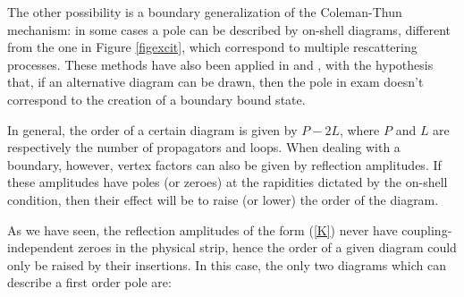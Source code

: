 \documentclass[a4paper,12pt]{report}
\begin{document}
The other possibility is a boundary generalization of the Coleman-Thun mechanism: in some cases a pole can be
described by on-shell diagrams, different from the one in Figure \ref{figexcit}, which correspond to multiple
rescattering processes. These methods have also been applied in \cite{delius} and \cite{dorey}, with the
hypothesis that, if an alternative diagram can be drawn, then the pole in exam doesn't correspond to the creation
of a boundary bound state.

In general, the order of a certain diagram is given by $P-2L$, where $P$ and $L$ are respectively the number of
propagators and loops. When dealing with a boundary, however, vertex factors can also be given by reflection
amplitudes. If these amplitudes have poles (or zeroes) at the rapidities dictated by the on-shell condition, then
their effect will be to raise (or lower) the order of the diagram.

As we have seen, the reflection amplitudes of the form (\ref{K}) never have coupling-independent zeroes in the
physical strip, hence the order of a given diagram could only be raised by their insertions. In this case, the
only two diagrams which can describe a first order pole are:

\vspace{5cm}
\end{document}

